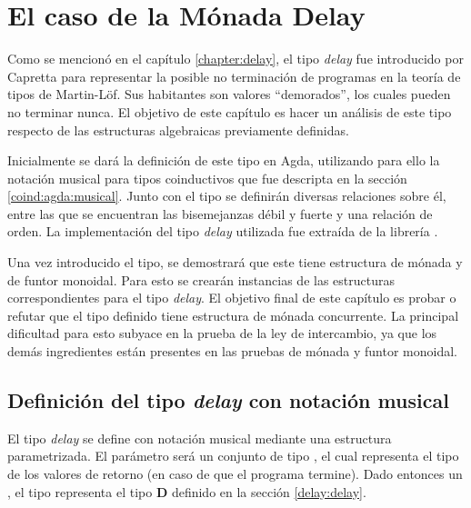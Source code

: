 \chapter{El caso de la Mónada Delay}\label{chapter:casodelay}

Como se mencionó en el capítulo \ref{chapter:delay}, el tipo \textit{delay} fue introducido por Capretta \cite{capretta:2005} para representar la posible no terminación de programas en la teoría de tipos de Martin-Löf. Sus habitantes son valores ``demorados'', los cuales pueden no terminar nunca. El objetivo de este capítulo es hacer un análisis de este tipo respecto de las estructuras algebraicas previamente definidas. 

Inicialmente se dará la definición de este tipo en Agda, utilizando para ello la notación musical para tipos coinductivos que fue descripta en la sección \ref{coind:agda:musical}. Junto con el tipo se definirán diversas relaciones sobre él, entre las que se encuentran las bisemejanzas débil y fuerte y una relación de orden. La implementación del tipo \textit{delay} utilizada fue extraída de la librería \href{https://agda.github.io/agda-stdlib/Effect.Monad.Partiality.html}{}.

Una vez introducido el tipo, se demostrará que este tiene estructura de mónada y de funtor monoidal. Para esto se crearán instancias de las estructuras correspondientes para el tipo \textit{delay}. El objetivo final de este capítulo es probar o refutar que el tipo definido tiene estructura de mónada concurrente. La principal dificultad para esto subyace en la prueba de la ley de intercambio, ya que los demás ingredientes están presentes en las pruebas de mónada y funtor monoidal. 

\section{Definición del tipo \textit{delay} con notación musical}\label{casodelay:defmus}

El tipo \textit{delay} se define con notación musical mediante una estructura  parametrizada. El parámetro será un conjunto  de tipo , el cual representa el tipo de los valores de retorno (en caso de que el programa termine). Dado entonces un  \AgdaSymbol{:} , el tipo  \AgdaDatatype{$\bot$} representa el tipo $\mathbf{D}$ definido en la sección \ref{delay:delay}. 


